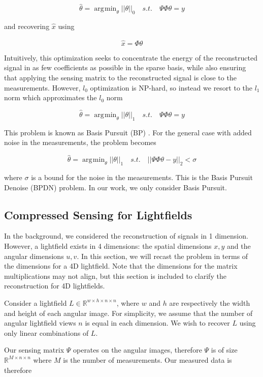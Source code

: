 \documentclass[10pt,twocolumn,letterpaper]{article}
\DeclareMathOperator*{\argmin}{\arg\!\min}
\begin{document}
\[ \hat{\theta} = \argmin_\theta ||\theta||_0 \quad s.t. \quad \Psi\Phi\theta = y\]

and recovering $\hat{x}$ using

\[ \hat{x} = \Phi \hat{\theta}\]

Intuitively, this optimization seeks to concentrate the energy of the reconstructed signal in as few coefficients as possible in the sparse basis, while also ensuring that applying the sensing matrix to the reconstructed signal is close to the measurements. However, $l_0$ optimization is NP-hard, so instead we resort to the $l_1$ norm which approximates the $l_0$ norm

\[ \hat{\theta} = \argmin_\theta ||\theta||_1 \quad s.t. \quad \Psi\Phi\theta = y\]

This problem is known as Basis Pursuit (BP) \cite{BasisPursuit1}. For the general case with added noise in the measurements, the problem becomes

\[ \hat{\theta} = \argmin_\theta ||\theta||_1 \quad s.t. \quad ||\Psi\Phi\theta - y||_2 < \sigma\]


where $\sigma$ is a bound for the noise in the measurements. This is the Basis Pursuit Denoise (BPDN) problem. In our work, we only consider Basis Pursuit.

\subsection{Compressed Sensing for Lightfields}

In the background, we considered the reconstruction of signals in 1 dimension. However, a lightfield exists in 4 dimensions: the spatial dimensions $x, y$ and the angular dimensions $u, v$. In this section, we will recast the problem in terms of the dimensions for a 4D lightfield. Note that the dimensions for the matrix multiplications may not align, but this section is included to clarify the reconstruction for 4D lightfields.

Consider a lightfield $L \in \mathbb{R}^{w \times h \times n \times n}$, where $w$ and $h$ are respectively the width and height of each angular image. For simplicity, we assume that the number of angular lightfield views $n$ is equal in each dimension. We wish to recover $L$ using only linear combinations of $L$.

Our sensing matrix $\Psi$ operates on the angular images, therefore $\Psi$ is of size $\mathbb{R}^{M \times n \times n}$ where $M$ is the number of measurements. Our measured data is therefore
\end{document}
